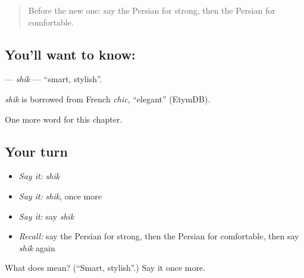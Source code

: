 \begin{quote}
Before the new one: say the Persian for strong, then the Persian for comfortable.
\end{quote}

\subsection*{You'll want to know: }
\textbf{} — \emph{shik} — \textquotedblleft{}smart, stylish\textquotedblright{}.

\begin{cousinweb}
\emph{shik} is borrowed from French \emph{chic}, \textquotedblleft{}elegant\textquotedblright{} (EtymDB).
\end{cousinweb}

\begin{grammarlens}[title={What you've built}]
One more word for this chapter.
\end{grammarlens}

\subsection*{Your turn}
\begin{itemize}
\raggedright
  \item \emph{Say it:} \emph{shik}
  \item \emph{Say it:} \emph{shik}, once more
  \item \emph{Say it:} say \emph{shik}
  \item \emph{Recall:} say the Persian for strong, then the Persian for comfortable, then say \emph{shik} again
\end{itemize}

\begin{tcolorbox}[breakable,colback=teal!4,colframe=teal!35!black,title={Before you move on}]
What does  mean? (\textquotedblleft{}Smart, stylish\textquotedblright{}.) Say it once more.
\end{tcolorbox}

